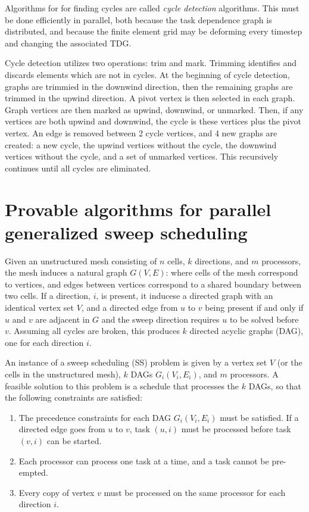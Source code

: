 \documentclass[11pt, letterpaper,titlepage,oneside]{article}
\begin{document}
Algorithms for for finding cycles are called \textit{cycle detection} algorithms. This must be done efficiently in parallel, both because the task dependence graph is distributed, and because the finite element grid may be deforming every timestep and changing the associated TDG.

Cycle detection utilizes two operations: trim and mark. Trimming identifies and discards elements which are not in cycles. At the beginning of cycle detection, graphs are trimmied in the downwind direction, then the remaining graphs are trimmed in the upwind direction. A pivot vertex is then selected in each graph. Graph vertices are then marked as upwind, downwind, or unmarked. Then, if any vertices are both upwind and downwind, the cycle is these vertices plus the pivot vertex. An edge is removed between 2 cycle vertices, and 4 new graphs are created: a new cycle, the upwind vertices without the cycle, the downwind vertices without the cycle, and a set of unmarked vertices. This recursively continues until all cycles are eliminated.

\section*{Provable algorithms for parallel generalized sweep scheduling\cite{kumar}}

Given an unstructured mesh consisting of $n$ cells, $k$ directions, and $m$ processors, the mesh induces a natural graph $G(V,E)$: where cells of the mesh correspond to vertices, and edges between vertices correspond to a shared boundary between two cells. If a direction, $i$, is present, it inducese a directed graph with an identical vertex set $V$, and a directed edge from $u$ to $v$ being present if and only if $u$ and $v$ are adjacent in $G$ and the sweep direction requires $u$ to be solved before $v$. Assuming all cycles are broken, this produces $k$ directed acyclic graphs (DAG), one for each direction $i$. 

An instance of a sweep scheduling (SS) problem is given by a vertex set $V$ (or the cells in the unstructured mesh), $k$ DAGs $G_i(V_i,E_i)$, and $m$ processors. A feasible solution to this problem is a schedule that processes the $k$ DAGs, so that the following constraints are satisfied:
\begin{enumerate}
\item The precedence constraints for each DAG $G_i(V_i,E_i)$ must be satisfied. If a directed edge goes from $u$ to $v$, task $(u,i)$ must be processed before task $(v,i)$ can be started.
\item Each processor can process one task at a time, and a task cannot be pre-empted.
\item Every copy of vertex $v$ must be processed on the same processor for each direction $i$. 
\end{enumerate}
\end{document}
